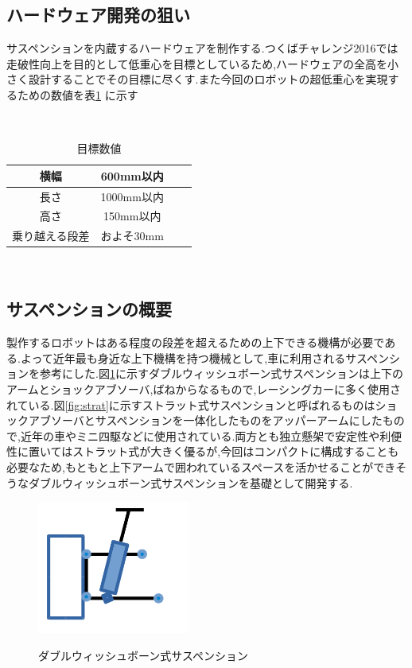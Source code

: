 \documentclass[12pt,oneside]{sotsuken_paper}
\begin{document}
\subsection{ハードウェア開発の狙い} 
サスペンションを内蔵するハードウェアを制作する.つくばチャレンジ2016では走破性向上を目的として低重心を目標としているため,ハードウェアの全高を小さく設計することでその目標に尽くす.また今回のロボットの超低重心を実現するための数値を表\ref{tab:joken} に示す 

\begin{table}[htp] 
 　\begin{center} 
    \caption{目標数値} 
  \begin{tabular}{|c|c|c|c|} \hline 
横幅 & 600mm以内  \\  \hline 
長さ & 1000mm以内\\ \hline 
高さ & 150mm以内 \\ \hline 
    乗り越える段差 & およそ30mm  \\ \hline 
  \end{tabular} 
　   \label{tab:joken} 
  \end{center} 
\end{table} 

\subsection{サスペンションの概要} 
製作するロボットはある程度の段差を超えるための上下できる機構が必要である.よって近年最も身近な上下機構を持つ機械として,車に利用されるサスペンションを参考にした.図\ref{fig:doublewish}に示すダブルウィッシュボーン式サスペンションは上下のアームとショックアブソーバ,ばねからなるもので,レーシングカーに多く使用されている.図\ref{fig:strat}に示すストラット式サスペンションと呼ばれるものはショックアブソーバとサスペンションを一体化したものをアッパーアームにしたもので,近年の車やミニ四駆などに使用されている.両方とも独立懸架で安定性や利便性に置いてはストラット式が大きく優るが,今回はコンパクトに構成することも必要なため,もともと上下アームで囲われているスペースを活かせることができそうなダブルウィッシュボーン式サスペンションを基礎として開発する. 

\begin{figure}[htp] 
 \begin{center} 
  \includegraphics[width=50mm]{img/hard/fig1.png} 
 　\caption{ダブルウィッシュボーン式サスペンション} 
  \label{fig:doublewish}%
 \end{center} 
\end{figure} 
\end{document}
